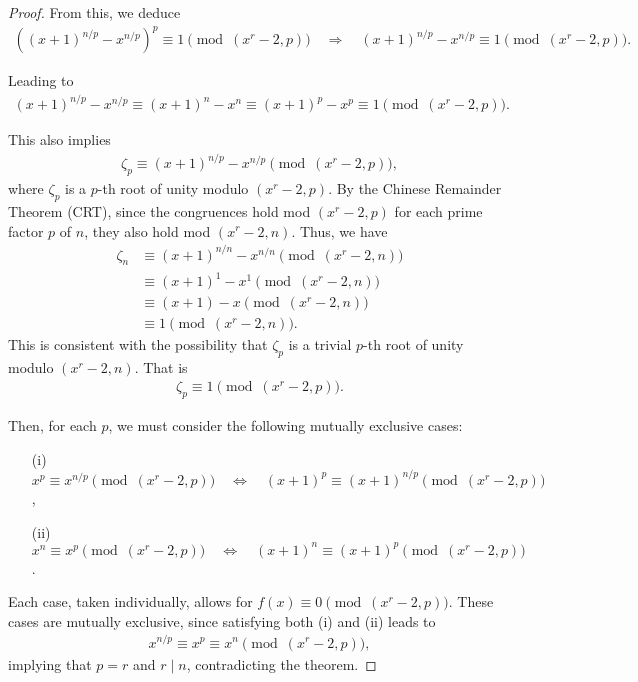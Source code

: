 \documentclass{article}
\theoremstyle{plain}
\theoremstyle{definition}
\begin{document}
\begin{proof}
From this, we deduce
\begin{align*}
\left( (x+1)^{n/p} - x^{n/p} \right)^p \equiv 1 \pmod{(x^r-2, p)}
\quad\Longrightarrow\quad
(x+1)^{n/p} - x^{n/p} \equiv 1 \pmod{(x^r-2, p)} .
\end{align*}

Leading to
\begin{align*}
(x+1)^{n/p} - x^{n/p} \equiv (x+1)^n - x^n \equiv (x+1)^p - x^p \equiv 1 \pmod{(x^r-2, p)} .
\end{align*}

This also implies
\begin{align*}
    \zeta_p \equiv (x+1)^{n/p} - x^{n/p} \pmod{(x^r-2, p)} ,
\end{align*}
where $\zeta_p$ is a $p$-th root of unity modulo $(x^r-2, p)$. By the Chinese Remainder Theorem (CRT), since the congruences hold mod $(x^r-2, p)$ for each prime factor $p$ of $n$, they also hold mod $(x^r-2, n)$. Thus, we have
\begin{align*}
\zeta_n &\equiv (x+1)^{n/n} - x^{n/n} \pmod{(x^r-2, n)} \\
&\equiv (x+1)^1 - x^1 \pmod{(x^r-2, n)} \\
&\equiv (x+1) - x \pmod{(x^r-2, n)} \\
&\equiv 1 \pmod{(x^r-2, n)} .
\end{align*}
This is consistent with the possibility that $\zeta_p$ is a trivial $p$-th root of unity modulo $(x^r-2, n)$. That is
\begin{align*}
\zeta_p \equiv 1 \pmod{(x^r-2, p)} .
\end{align*}

Then, for each $p$, we must consider the following mutually exclusive cases:
\begin{enumerate}
\item[(i)] $x^p \equiv x^{n/p} \pmod{(x^r-2, p)} \quad\Longleftrightarrow\quad (x+1)^p \equiv (x+1)^{n/p} \pmod{(x^r-2, p)}$,
\item[(ii)] $x^n \equiv x^p \pmod{(x^r-2, p)} \quad\Longleftrightarrow\quad (x+1)^n \equiv (x+1)^p \pmod{(x^r-2, p)}$.
\end{enumerate}
Each case, taken individually, allows for $f(x) \equiv 0 \pmod{(x^r-2,p)}$. These cases are mutually exclusive, since satisfying both (i) and (ii) leads to
\begin{align*}
    x^{n/p} \equiv x^p \equiv x^n \pmod{(x^r-2, p)} ,
\end{align*}
implying that $p=r$ and $r \mid n$, contradicting the theorem.


\end{proof}
\end{document}
